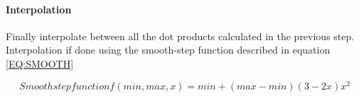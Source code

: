 \paragraph{Interpolation}
Finally interpolate between all the dot products calculated in the previous step.
Interpolation if done using the smooth-step function described in equation \ref{EQ:SMOOTH}

\begin{equation}[EQ:SMOOTH]{Smoothstep function}
\boxed{f(min, max, x) = min + (max - min)(3 - 2x)x^2}
\end{equation}
